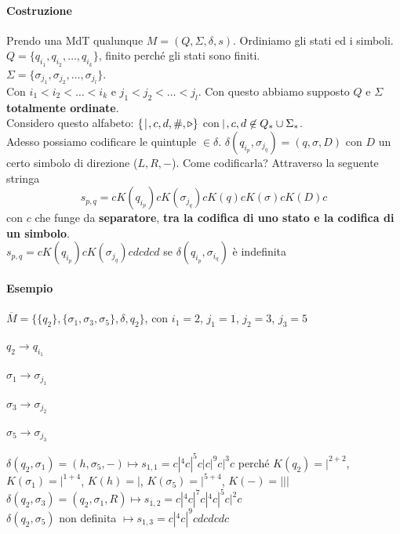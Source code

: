 \documentclass[10pt]{book}
\begin{document}
\paragraph{Costruzione} Prendo una MdT qualunque $M = (Q, \Sigma, \delta, s)$. Ordiniamo gli stati ed i simboli.\\
$Q = \{q_{i_1}, q_{i_2}, \ldots, q_{i_k}\}$, finito perché gli stati sono finiti.\\
$\Sigma = \{\sigma_{j_1}, \sigma_{j_2}, \ldots, \sigma_{j_l}\}$.\\
Con $i_1 < i_2 < \ldots < i_k$ e $j_1 < j_2 < \ldots < j_l$. Con questo abbiamo supposto $Q$ e $\Sigma$ \textbf{totalmente ordinate}.\\
Considero questo alfabeto: $\{\:\vline\:, c, d, \#, \triangleright\}$ con $\vline\:, c, d \not\in Q_* \cup \Sigma_*$.\\
Adesso possiamo codificare le quintuple $\in \delta$. $\delta(q_{i_p}, \sigma_{j_q}) = (q, \sigma, D)$ con $D$ un certo simbolo di direzione ($L, R, -$). Come codificarla? Attraverso la seguente stringa
$$s_{p,q} = cK(q_{i_p})cK(\sigma_{j_q})cK(q)cK(\sigma)cK(D)c$$
con $c$ che funge da \textbf{separatore}, \textbf{tra la codifica di uno stato e la codifica di un simbolo}.\\
$s_{p,q} = cK(q_{i_p})cK(\sigma_{j_q})cdcdcd$ se $\delta(q_{i_p}, \sigma_{i_q})$ è indefinita
\pagebreak
\paragraph{Esempio} $\overline{M} = \{\{q_2\}, \{\sigma_1, \sigma_3, \sigma_5\}, \delta, q_2\}$, con $i_1 = 2$, $j_1 = 1$, $j_2 = 3$, $j_3 = 5$
\begin{list}{}{}
	\item $q_2 \rightarrow q_{i_1}$
	\item $\sigma_1 \rightarrow \sigma_{j_1}$
	\item $\sigma_3 \rightarrow \sigma_{j_2}$
	\item $\sigma_5 \rightarrow \sigma_{j_3}$
\end{list}
$\delta(q_2, \sigma_1) = (h, \sigma_5, -) \mapsto s_{1, 1} = c|^4c|^5c|c|^9c|^3c$ perché $K(q_2) = |^{2 + 2}$, $K(\sigma_1) = |^{1 + 4}$, $K(h) = |$, $K(\sigma_5) = |^{5 + 4}$, $K(-) = |||$ \\
$\delta(q_2, \sigma_3) = (q_2, \sigma_1, R) \mapsto s_{1, 2} = c|^4c|^7c|^4c|^5c|^2c$\\
$\delta(q_2, \sigma_5)$ non definita $\mapsto s_{1, 3} = c|^4c|^9cdcdcdc$
\end{document}
